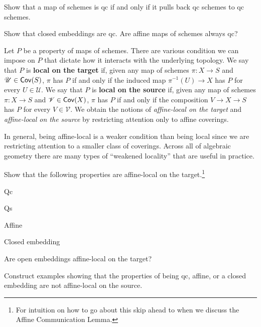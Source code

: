\documentclass[11pt]{article}
\newcommand{\U}{\mathscr{U}}
\newcommand{\V}{\mathscr{V}}
\begin{document}
\begin{exercise}
Show that a map of schemes is qc if and only if it pulls back qc schemes to qc schemes.
\end{exercise}

\begin{exercise}
Show that closed embeddings are qc. Are affine maps of schemes always qc?
\end{exercise}

Let $P$ be a property of maps of schemes. There are various condition we can impose on $P$ that dictate how it interacts with the underlying topology. We say that $P$ is \textbf{local on the target} if, given any map of schemes $\pi: X\to S$ and $\U\in\Cov(S)$, $\pi$ has $P$ if and only if the induced map $\pi^{-1}(U)\to X$ has $P$ for every $U\in\U$. We say that $P$ is \textbf{local on the source} if, given any map of schemes $\pi: X\to S$ and $\V\in\Cov(X)$, $\pi$ has $P$ if and only if the composition $V\to X\to S$ has $P$ for every $V\in\V$. We obtain the notions of \emph{affine-local on the target} and \emph{affine-local on the source} by restricting attention only to affine coverings. 

\begin{remark}
In general, being affine-local is a weaker condition than being local since we are restricting attention to a smaller class of coverings. Across all of algebraic geometry there are many types of ``weakened locality'' that are useful in practice.
\end{remark}

\begin{exercise}
Show that the following properties are affine-local on the target.\footnote{For intuition on how to go about this skip ahead to when we discuss the Affine Communication Lemma.}
\begin{enum}{\arabic}
\item Qc

\item Qs

\item Affine

\item Closed embedding
\end{enum}
\end{exercise}

\begin{exercise}
Are open embeddings affine-local on the target?
\end{exercise}

\begin{exercise}
Construct examples showing that the properties of being qc, affine, or a closed embedding are not affine-local on the source.
\end{exercise}
\end{document}
